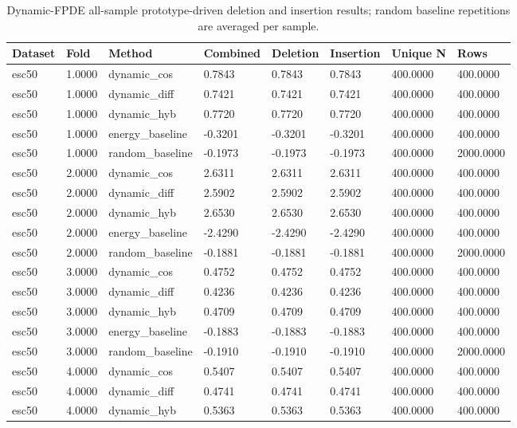 \begin{table}[htbp]
\centering
\caption{Dynamic-FPDE all-sample prototype-driven deletion and insertion results; random baseline repetitions are averaged per sample.}
\label{tab:dynamic-fpde-main-results}
\begin{tabular}{llllllll}
\toprule
Dataset & Fold & Method & Combined & Deletion & Insertion & Unique N & Rows \\
\midrule
esc50 & 1.0000 & dynamic\_cos & 0.7843 & 0.7843 & 0.7843 & 400.0000 & 400.0000 \\
esc50 & 1.0000 & dynamic\_diff & 0.7421 & 0.7421 & 0.7421 & 400.0000 & 400.0000 \\
esc50 & 1.0000 & dynamic\_hyb & 0.7720 & 0.7720 & 0.7720 & 400.0000 & 400.0000 \\
esc50 & 1.0000 & energy\_baseline & -0.3201 & -0.3201 & -0.3201 & 400.0000 & 400.0000 \\
esc50 & 1.0000 & random\_baseline & -0.1973 & -0.1973 & -0.1973 & 400.0000 & 2000.0000 \\
esc50 & 2.0000 & dynamic\_cos & 2.6311 & 2.6311 & 2.6311 & 400.0000 & 400.0000 \\
esc50 & 2.0000 & dynamic\_diff & 2.5902 & 2.5902 & 2.5902 & 400.0000 & 400.0000 \\
esc50 & 2.0000 & dynamic\_hyb & 2.6530 & 2.6530 & 2.6530 & 400.0000 & 400.0000 \\
esc50 & 2.0000 & energy\_baseline & -2.4290 & -2.4290 & -2.4290 & 400.0000 & 400.0000 \\
esc50 & 2.0000 & random\_baseline & -0.1881 & -0.1881 & -0.1881 & 400.0000 & 2000.0000 \\
esc50 & 3.0000 & dynamic\_cos & 0.4752 & 0.4752 & 0.4752 & 400.0000 & 400.0000 \\
esc50 & 3.0000 & dynamic\_diff & 0.4236 & 0.4236 & 0.4236 & 400.0000 & 400.0000 \\
esc50 & 3.0000 & dynamic\_hyb & 0.4709 & 0.4709 & 0.4709 & 400.0000 & 400.0000 \\
esc50 & 3.0000 & energy\_baseline & -0.1883 & -0.1883 & -0.1883 & 400.0000 & 400.0000 \\
esc50 & 3.0000 & random\_baseline & -0.1910 & -0.1910 & -0.1910 & 400.0000 & 2000.0000 \\
esc50 & 4.0000 & dynamic\_cos & 0.5407 & 0.5407 & 0.5407 & 400.0000 & 400.0000 \\
esc50 & 4.0000 & dynamic\_diff & 0.4741 & 0.4741 & 0.4741 & 400.0000 & 400.0000 \\
esc50 & 4.0000 & dynamic\_hyb & 0.5363 & 0.5363 & 0.5363 & 400.0000 & 400.0000 \\

\end{tabular}
\end{table}
